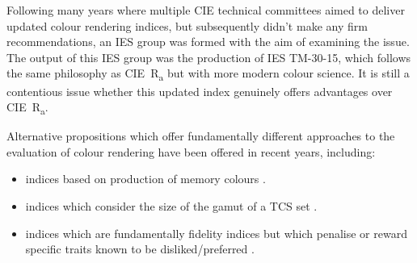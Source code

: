 Following many years where multiple \gls{CIE} technical committees aimed to deliver updated colour rendering indices, but subsequently didn't make any firm recommendations, an IES group was formed with the aim of examining the issue. The output of this IES group was the production of IES TM-30-15\cite{ies_ies_2015}, which follows the same philosophy as \gls{CIE}~R\textsubscript{a} but with more modern colour science. It is still a contentious issue whether this updated index genuinely offers advantages over \gls{CIE}~R\textsubscript{a}. 

Alternative propositions which offer fundamentally different approaches to the evaluation of colour rendering have been offered in recent years, including: 
\begin{itemize}
\item indices based on production of memory colours \citep{smet_memory_2012}.
\item indices which consider the size of the gamut of a \gls{TCS} set \citep{rea_color_2008,teunissen_characterising_2016}.
\item indices which are fundamentally fidelity indices but which penalise or reward specific traits known to be disliked/preferred \citep{ohno_rationale_2010}.
\end{itemize}

